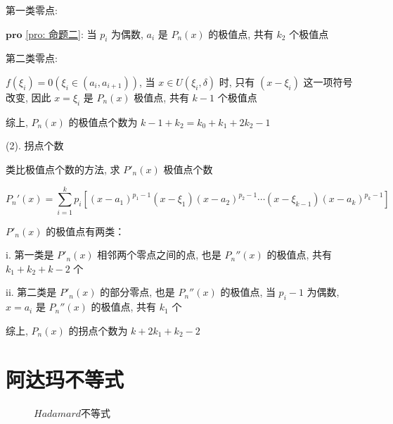 \begin{anymark}[证明]
	第一类零点:
	
	$\mathbf{pro}$ \ref{pro: 命题二}: 当 $p_{i}$ 为偶数, $a_{i}$ 是 $P_{n}(x)$ 的极值点, 共有 $k_{2}$ 个极值点
	
	第二类零点: 
	
	$f(\xi_{i}) = 0 (\xi_{i}\in (a_{i},a_{i+1}))$, 当 $x\in U(\xi_{i},\delta)$ 时, 只有 $(x-\xi_{i})$ 这一项符号改变, 
	因此 $x=\xi_{i}$ 是 $P_{n}(x)$ 极值点, 共有 $k - 1$ 个极值点
	
	综上, $P_{n}(x)$ 的极值点个数为 $k - 1 + k_{2} = k_{0} + k_{1} + 2k_{2} - 1$


	(2). 拐点个数
	
	类比极值点个数的方法, 求 $P'_{n}(x)$ 极值点个数
	
	$$P_{n}'(x) = \sum\limits_{i=1}^{k}p_{i}\left[(x-a_{1})^{p_{1}-1}(x-\xi_{1})(x-a_{2})^{p_{2}-1}\cdots(x-\xi_{k-1})(x-a_{k})^{p_{k}-1}\right]$$

	$P'_{n}(x)$ 的极值点有两类：
	
	i. 第一类是 $P'_{n}(x)$ 相邻两个零点之间的点, 也是 $P_{n}''(x)$ 的极值点, 共有 $k_{1} + k_{2} + k - 2$ 个
	
	ii. 第二类是 $P'_{n}(x)$ 的部分零点, 也是 $P_{n}''(x)$ 的极值点, 当 $p_{i} - 1$ 为偶数, $x = a_{i}$ 是 $P_{n}''(x)$ 的极值点, 共有 $k_{1}$ 个
	
	综上, $P_{n}(x)$ 的拐点个数为 $k + 2k_{1} + k_{2} - 2$
\end{anymark}

\section{阿达玛不等式}

\begin{figure}[H]
	\centering
	\caption{$Hadamard$不等式}
	\label{Figure: 阿达玛不等式}
\end{figure}

